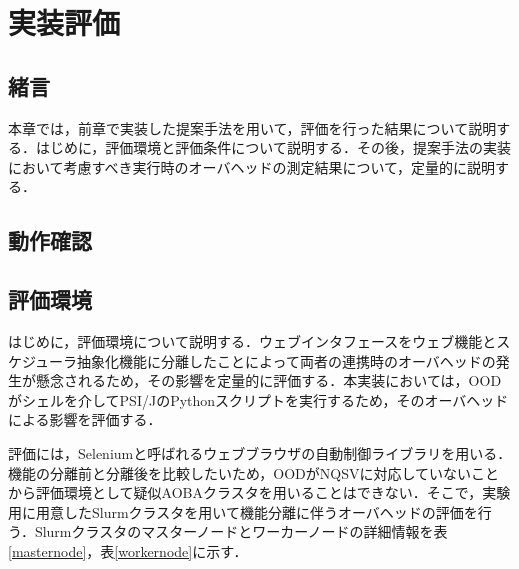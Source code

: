 \section{実装評価}
\subsection{緒言}
本章では，前章で実装した提案手法を用いて，評価を行った結果について説明する．はじめに，評価環境と評価条件について説明する．その後，提案手法の実装において考慮すべき実行時のオーバヘッドの測定結果について，定量的に説明する．\par

\subsection{動作確認}


\subsection{評価環境}
はじめに，評価環境について説明する．ウェブインタフェースをウェブ機能とスケジューラ抽象化機能に分離したことによって両者の連携時のオーバヘッドの発生が懸念されるため，その影響を定量的に評価する．本実装においては，OODがシェルを介してPSI/JのPythonスクリプトを実行するため，そのオーバヘッドによる影響を評価する．\par
評価には，Selenium\cite{cite6}と呼ばれるウェブブラウザの自動制御ライブラリを用いる．機能の分離前と分離後を比較したいため，OODがNQSVに対応していないことから評価環境として疑似AOBAクラスタを用いることはできない．そこで，実験用に用意したSlurmクラスタを用いて機能分離に伴うオーバヘッドの評価を行う．Slurmクラスタのマスターノードとワーカーノードの詳細情報を表\ref{masternode}，表\ref{workernode}に示す．\par

